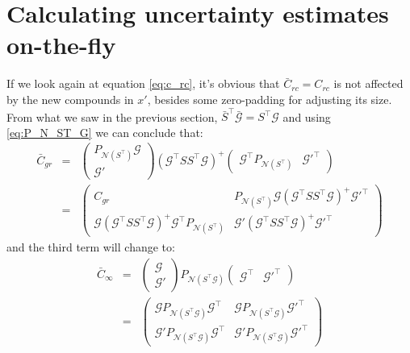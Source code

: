 \documentclass[11pt]{article}
\newcommand{\Gmat}{\mathcal{G}}
\newcommand{\PNmat}[1]{P_{\mathcal{N}\left(#1\right)}}
\begin{document}
\section{Calculating uncertainty estimates on-the-fly}
If we look again at equation \ref{eq:c_rc}, it's obvious that $\bar{C}_{rc} = C_{rc}$ is not affected by the new compounds in $x'$, besides some zero-padding for adjusting its size. From what we saw in the previous section, $\bar{S}^\top \bar{\Gmat} = S^\top \Gmat$ and using \ref{eq:P_N_ST_G} we can conclude that:
\begin{eqnarray}
	\bar{C}_{gr} &=& \left( \begin{array}{c} \PNmat{S^\top} \Gmat \\ \hline \Gmat' \end{array} \right)
	\left(\Gmat^{\top}SS^{\top}\Gmat\right)^{+} 
	\left( \begin{array}{c|c} \Gmat^\top \PNmat{S^\top} & \Gmat'^\top \end{array} \right) 
\\
&=&
\left( \begin{array}{c|c} C_{gr} & \PNmat{S^\top} \Gmat \left(\Gmat^{\top}SS^{\top}\Gmat\right)^{+} \Gmat'^\top \\ \hline \Gmat \left(\Gmat^{\top}SS^{\top}\Gmat\right)^{+} \Gmat^\top \PNmat{S^\top} & \Gmat'\left(\Gmat^{\top}SS^{\top}\Gmat\right)^{+} \Gmat'^\top \end{array} \right)
\end{eqnarray}
and the third term will change to:
\begin{eqnarray}
	\bar{C}_{\infty} &=& 
		\left(\begin{array}{c} \Gmat \\ \hline \Gmat' \end{array}\right)
		\PNmat{S^\top\Gmat}
		\left(\begin{array}{c|c} \Gmat^\top & \Gmat'^\top \end{array}\right)
\\ &=&
	\left(\begin{array}{c|c}
		\Gmat \PNmat{S^\top\Gmat} \Gmat^\top &
		\Gmat \PNmat{S^\top\Gmat} \Gmat'^\top \\ \hline
		\Gmat' \PNmat{S^\top\Gmat} \Gmat^\top &
		\Gmat' \PNmat{S^\top\Gmat} \Gmat'^\top
 \end{array}\right)
\end{eqnarray}
\end{document}
